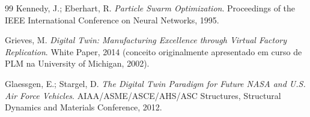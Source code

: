 \documentclass[12pt,a4paper]{article}
\numberwithin{equation}{section}
\numberwithin{table}{section}
\numberwithin{figure}{section}
\begin{document}
\begin{thebibliography}{99}
 Kennedy, J.; Eberhart, R. \textit{Particle Swarm Optimization}. Proceedings of the IEEE International Conference on Neural Networks, 1995.

 Grieves, M. \textit{Digital Twin: Manufacturing Excellence through Virtual Factory Replication}. White Paper, 2014 (conceito originalmente apresentado em curso de PLM na University of Michigan, 2002).

 Glaessgen, E.; Stargel, D. \textit{The Digital Twin Paradigm for Future NASA and U.S. Air Force Vehicles}. AIAA/ASME/ASCE/AHS/ASC Structures, Structural Dynamics and Materials Conference, 2012.

\end{thebibliography}
\end{document}
